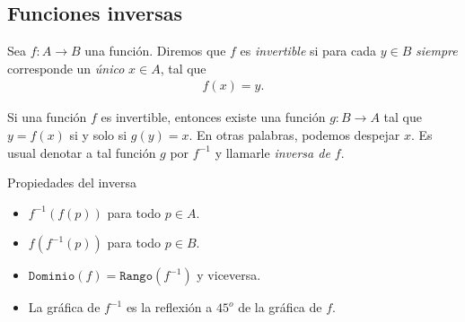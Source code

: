 \subsection{Funciones inversas}
{}
	Sea $f:A\to B$ una función. Diremos que $f$ es \emph{invertible} si para cada $y\in B$ \emph{siempre} corresponde un \emph{único} $x\in A$, tal que
	\begin{align*}
		f(x)=y.
	\end{align*}

{}
	Si una función $f$ es invertible, entonces existe una función $g:B\to A$ tal que $y=f(x)$ si y solo si $g(y)=x$.  En otras palabras, podemos despejar $x$.  Es usual denotar a tal función $g$ por $f^{-1}$ y llamarle \emph{inversa de $f$}.

{Propiedades del inversa}
	\begin{itemize}
		\item $f^{-1}\left( f(p) \right)$ para todo $p\in A.$ 
		\item $f\left( f^{-1}(p) \right)$ para todo $p\in B.$ 
		\item $\texttt{Dominio}(f)=\texttt{Rango}(f^{-1})$ y viceversa. 
		\item La gráfica de $f^{-1}$ es la reflexión a $45^{o}$ de la gráfica de $f$.
	\end{itemize}
	

